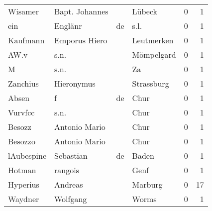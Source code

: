 \begin{center}
\begin{tiny}
\begin{longtabu}{llllrr}
                  Wisamer &                     Bapt. Johannes &             &                                      Lübeck &          0 &         1 \\
                      ein &                            Englänr &          de &                                        s.l. &          0 &         1 \\
                 Kaufmann &                      Emporus Hiero &             &                                  Leutmerken &          0 &         1 \\
                     AW.v &                               s.n. &             &                                  Mömpelgard &          0 &         1 \\
                        M &                               s.n. &             &                                          Za &          0 &         1 \\
                 Zanchius &                         Hieronymus &             &                                  Strassburg &          0 &         1 \\
                    Absen &                                  f &          de &                                        Chur &          0 &         1 \\
                  Vurvfcc &                               s.n. &             &                                        Chur &          0 &         1 \\
                   Besozz &                      Antonio Mario &             &                                        Chur &          0 &         1 \\
                  Besozzo &                      Antonio Mario &             &                                        Chur &          0 &         1 \\
               lAubespine &                          Sebastian &          de &                                       Baden &          0 &         1 \\
                   Hotman &                            rangois &             &                                        Genf &          0 &         1 \\
                 Hyperius &                            Andreas &             &                                     Marburg &          0 &        17 \\
                  Waydner &                           Wolfgang &             &                                       Worms &          0 &         1 \\

\end{longtabu}
\end{tiny}
\end{center}
